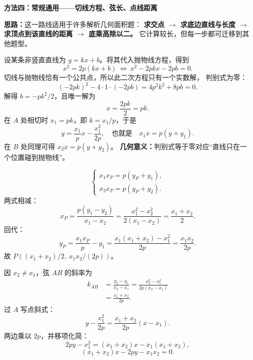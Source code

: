 \begin{proofbox}
    \medskip
    \par\noindent\begin{minipage}{\linewidth}
    \textbf{\textcolor{CProof}{方法四：常规通用——切线方程、弦长、点线距离}}

    
    \end{minipage}\par

    \textbf{思路：}这一路线适用于许多解析几何面积题：
    \textbf{求交点 $\to$ 求底边直线与长度 $\to$ 求顶点到该直线的距离 $\to$ 底乘高除以二。}
    它计算较长，但每一步都可迁移到其他题型。

    \begin{description}[style=nextline, leftmargin=2.8em, labelsep=0.5em, itemsep=0.55em]
        \item[\textbf{第一步（从相切条件推导切线方程）：}]
        设某条非竖直直线为 $y=kx+b$。将其代入抛物线方程，得到
        \[
            x^2=2p(kx+b)
            \ \Longleftrightarrow\ x^2-2pkx-2pb=0.
        \]
        切线与抛物线恰有一个公共点，所以此二次方程只有一个实数解，
        判别式为零：
        \[
            (-2pk)^2-4\cdot1\cdot(-2pb)
            =4p^2k^2+8pb=0.
        \]
        解得 $b=-pk^2/2$，且唯一解为
        \[
            x=\frac{2pk}{2}=pk.
        \]
        在 $A$ 处相切时 $x_1=pk$，即 $k=x_1/p$，于是
        \[
            y=\frac{x_1}{p}x-\frac{x_1^2}{2p},
            \quad\text{也就是}\quad x_1x=p(y+y_1).
        \]
        在 $B$ 处同理可得 $x_2x=p(y+y_2)$。
        \textbf{几何意义：}判别式等于零对应“直线只在一个位置碰到抛物线”。

        \item[\textbf{第二步（联立求两切线交点）：}]
        \[
            \begin{cases}
                x_1x_P=p(y_P+y_1),\\
                x_2x_P=p(y_P+y_2).
            \end{cases}
        \]
        两式相减：
        \[
            x_P=\frac{p(y_1-y_2)}{x_1-x_2}
            =\frac{x_1^2-x_2^2}{2(x_1-x_2)}
            =\frac{x_1+x_2}{2}.
        \]
        回代：
        \[
            y_P=\frac{x_1x_P}{p}-y_1
            =\frac{x_1(x_1+x_2)-x_1^2}{2p}
            =\frac{x_1x_2}{2p}.
        \]
        故 $P\left((x_1+x_2)/2,\ x_1x_2/(2p)\right)$。

        \item[\textbf{第三步（两点确定底边 $AB$ 的方程）：}]
        因 $x_2\ne x_1$，弦 $AB$ 的斜率为
        \[
        \begin{aligned}
            k_{AB}
            &=\frac{y_2-y_1}{x_2-x_1}
              =\frac{x_2^2-x_1^2}{2p(x_2-x_1)}\\
            &=\frac{x_1+x_2}{2p}.
        \end{aligned}
        \]
        过 $A$ 写点斜式：
        \[
            y-\frac{x_1^2}{2p}
            =\frac{x_1+x_2}{2p}(x-x_1).
        \]
        两边乘以 $2p$，并移项化简：
        \[
            2py-x_1^2=(x_1+x_2)x-x_1(x_1+x_2),
        \]
        \[
            \boxed{(x_1+x_2)x-2py-x_1x_2=0}.
        \]


\end{description}
\end{proofbox}
